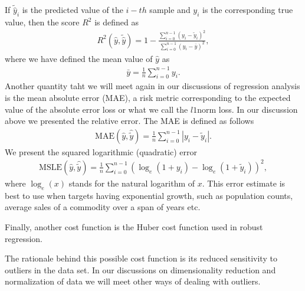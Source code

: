 \documentclass[letterpaper,10pt,english]{sphinxmanual}
\begin{document}
If \(\tilde{\hat{y}}_i\) is the predicted value of the \(i-th\) sample and \(y_i\) is the corresponding true value, then the score \(R^2\) is defined as
\begin{equation*}
\begin{split}
R^2(\hat{y}, \tilde{\hat{y}}) = 1 - \frac{\sum_{i=0}^{n - 1} (y_i - \tilde{y}_i)^2}{\sum_{i=0}^{n - 1} (y_i - \bar{y})^2},
\end{split}
\end{equation*}
where we have defined the mean value  of \(\hat{y}\) as
\begin{equation*}
\begin{split}
\bar{y} =  \frac{1}{n} \sum_{i=0}^{n - 1} y_i.
\end{split}
\end{equation*}
Another quantity taht we will meet again in our discussions of regression analysis is
the mean absolute error (MAE), a risk metric corresponding to the expected value of the absolute error loss or what we call the \(l1\)\sphinxhyphen{}norm loss. In our discussion above we presented the relative error.
The MAE is defined as follows
\begin{equation*}
\begin{split}
\text{MAE}(\hat{y}, \hat{\tilde{y}}) = \frac{1}{n} \sum_{i=0}^{n-1} \left| y_i - \tilde{y}_i \right|.
\end{split}
\end{equation*}
We present the
squared logarithmic (quadratic) error
\begin{equation*}
\begin{split}
\text{MSLE}(\hat{y}, \hat{\tilde{y}}) = \frac{1}{n} \sum_{i=0}^{n - 1} (\log_e (1 + y_i) - \log_e (1 + \tilde{y}_i) )^2,
\end{split}
\end{equation*}
where \(\log_e (x)\) stands for the natural logarithm of \(x\). This error
estimate is best to use when targets having exponential growth, such
as population counts, average sales of a commodity over a span of
years etc.

Finally, another cost function is the Huber cost function used in robust regression.

The rationale behind this possible cost function is its reduced
sensitivity to outliers in the data set. In our discussions on
dimensionality reduction and normalization of data we will meet other
ways of dealing with outliers.
\end{document}
